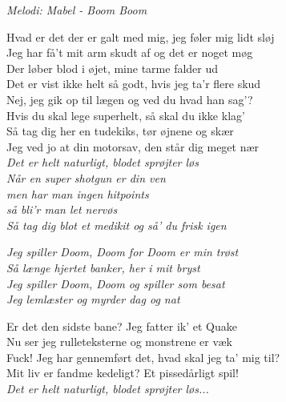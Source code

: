 \emph{Melodi: Mabel - Boom Boom}
\begin{flushleft}
Hvad er det der er galt med mig, jeg føler mig lidt sløj\\
Jeg har få't mit arm skudt af og det er noget møg\\
Der løber blod i øjet, mine tarme falder ud\\
Det er vist ikke helt så godt, hvis jeg ta'r flere skud\\[5mm]

Nej, jeg gik op til lægen og ved du hvad han sag'?\\
Hvis du skal lege superhelt, så skal du ikke klag'\\
Så tag dig her en tudekiks, tør øjnene og skær\\
Jeg ved jo at din motorsav, den står dig meget nær\\[5mm]

\emph{%
Det er helt naturligt, blodet sprøjter løs\\
Når en super shotgun er din ven\\
men har man ingen hitpoints\\
så bli'r man let nervøs\\
Så tag dig blot et medikit og så' du frisk igen\\[5mm]
}

\emph{%
Jeg spiller Doom, Doom for Doom er min trøst\\
Så længe hjertet banker, her i mit bryst\\
Jeg spiller Doom, Doom og spiller som besat\\
Jeg lemlæster og myrder dag og nat\\[5mm]
}

Er det den sidste bane? Jeg fatter ik' et Quake\\
Nu ser jeg rulleteksterne og monstrene er væk\\
Fuck! Jeg har gennemført det, hvad skal jeg ta' mig til?\\
Mit liv er fandme kedeligt? Et pissedårligt spil!\\[5mm]

\emph{Det er helt naturligt, blodet sprøjter løs...}
\end{flushleft}
